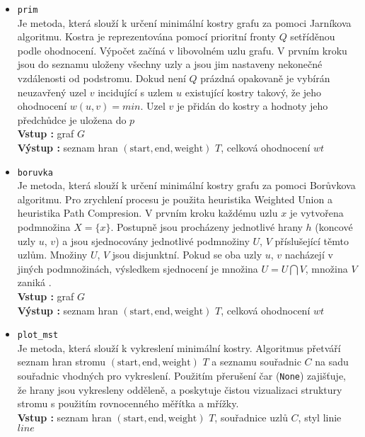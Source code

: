 \begin{itemize}
    \item \texttt{prim}\\
    Je metoda, která slouží k určení minimální kostry grafu za pomoci Jarníkova algoritmu. Kostra je reprezentována pomocí prioritní fronty $Q$ setříděnou podle ohodnocení. Výpočet začíná v libovolném uzlu grafu. V prvním kroku jsou do seznamu uloženy všechny uzly a jsou jim nastaveny nekonečné vzdálenosti od podstromu. Dokud není $Q$ prázdná opakovaně je vybírán neuzavřený uzel $v$ incidující s uzlem $u$ existující kostry takový, že jeho ohodnocení $w(u,v) = min$. Uzel $v$ je přidán do kostry a hodnoty jeho předchůdce je uložena do $p$\cite{Bayer2008}\\
    \textbf{Vstup : } graf $G$\\
    \textbf{Výstup : } seznam hran $(\text{start}, \text{end}, \text{weight})$ $T$, celková ohodnocení $wt$
    \item \texttt{boruvka}\\
    Je metoda, která slouží k určení minimální kostry grafu za pomoci Borůvkova algoritmu. Pro zrychlení procesu je použita heuristika Weighted Union a heuristika Path Compresion. V prvním kroku každému uzlu $x$ je vytvořena podmnožina $X=\{x\}$. Postupně jsou procházeny jednotlivé hrany $h$ (koncové uzly $u$, $v$) a jsou sjednocovány jednotlivé podmnožiny $U$, $V$ příslušející těmto uzlům. Množiny $U$, $V$ jsou disjunktní. Pokud se oba uzly $u$, $v$ nacházejí v jiných podmnožinách, výsledkem sjednocení je množina $U = U \bigcap V$, množina $V$ zaniká \cite{Bayer2008}.\\
    \textbf{Vstup : } graf $G$\\
    \textbf{Výstup : } seznam hran $(\text{start}, \text{end}, \text{weight})$ $T$, celková ohodnocení $wt$
    \item \texttt{plot\_mst}\\
    Je metoda, která slouží k vykreslení minimální kostry. Algoritmus přetváří seznam hran stromu $(\text{start}, \text{end}, \text{weight})$ $T$  a seznamu souřadnic $C$ na sadu souřadnic vhodných pro vykreslení. Použitím přerušení čar (\texttt{None}) zajišťuje, že hrany jsou vykresleny odděleně, a poskytuje čistou vizualizaci struktury stromu s použitím rovnocenného měřítka a mřížky.\\
    \textbf{Vstup : } seznam hran $(\text{start}, \text{end}, \text{weight})$ $T$, souřadnice uzlů $C$, styl linie $line$
\end{itemize}


